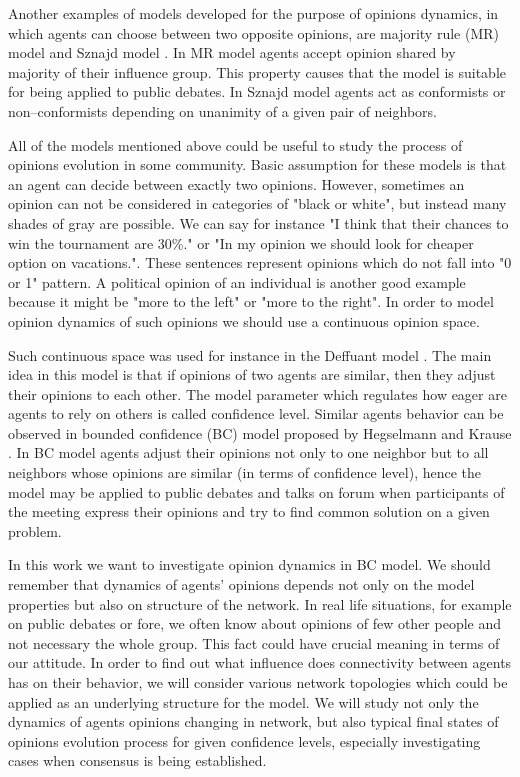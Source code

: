 \documentclass[a4paper, 12pt]{article}
\begin{document}
Another examples of models developed for the purpose of opinions dynamics, in which agents can choose between two opposite opinions, are majority rule (MR) model \cite{mr} and Sznajd model \cite{sm}. In MR model agents accept opinion shared by majority of their influence group. This property causes that the model is suitable for being applied to public debates. In Sznajd model agents act as conformists or non--conformists depending on unanimity of a given pair of neighbors.
\indent

All of the models mentioned above could be useful to study the process of opinions evolution in some community. Basic assumption for these models is that an agent can decide between exactly two opinions. However, sometimes an opinion can not be considered in categories of "black or white", but instead many shades of gray are possible. We can say for instance "I think that their chances to win the tournament are 30\%." or "In my opinion we should look for cheaper option on vacations.". These sentences represent opinions which do not fall into "0 or 1" pattern. A political opinion of an individual is another good example because it might be "more to the left" or "more to the right". In order to model opinion dynamics of such opinions we should use a continuous opinion space.
\indent

Such continuous space was used for instance in the Deffuant model \cite{dm}. The main idea in this model is that if opinions of two agents are similar, then they adjust their opinions to each other. The model parameter which regulates how eager are agents to rely on others is called confidence level. Similar agents behavior can be observed in bounded confidence (BC) model proposed by Hegselmann and Krause \cite{bc}. In BC model agents adjust their opinions not only to one neighbor but to all neighbors whose opinions are similar (in terms of confidence level), hence the model may be applied to public debates and talks on forum when participants of the meeting express their opinions and try to find common solution on a given problem.
\indent

In this work we want to investigate opinion dynamics in BC model. We should remember that dynamics of agents' opinions depends not only on the model properties but also on structure of the network. In real life situations, for example on public debates or fore, we often know about opinions of few other people and not necessary the whole group. This fact could have crucial meaning in terms of our attitude. In order to find out what influence does connectivity between agents has on their behavior, we will consider various network topologies which could be applied as an underlying structure for the model. We will study not only the dynamics of agents opinions changing in network, but also typical final states of opinions evolution process for given confidence levels, especially investigating cases when consensus is being established.
\end{document}

